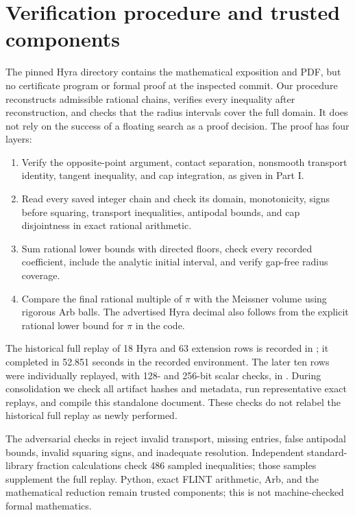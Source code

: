 \documentclass[11pt]{article}
\theoremstyle{remark}\newtheorem{remark}[theorem]{Remark}
\begin{document}
\section{Verification procedure and trusted components}\label{reproduction}
The pinned Hyra directory contains the mathematical exposition and PDF, but no certificate program or formal proof at the inspected commit. Our procedure reconstructs admissible rational chains, verifies every inequality after reconstruction, and checks that the radius intervals cover the full domain. It does not rely on the success of a floating search as a proof decision. The proof has four layers:
\begin{enumerate}
\item Verify the opposite-point argument, contact separation, nonsmooth transport identity, tangent inequality, and cap integration, as given in Part I.
\item Read every saved integer chain and check its domain, monotonicity, signs before squaring, transport inequalities, antipodal bounds, and cap disjointness in exact rational arithmetic.
\item Sum rational lower bounds with directed floors, check every recorded coefficient, include the analytic initial interval, and verify gap-free radius coverage.
\item Compare the final rational multiple of $\pi$ with the Meissner volume using rigorous Arb balls. The advertised Hyra decimal also follows from the explicit rational lower bound for $\pi$ in the code.
\end{enumerate}
The historical full replay of 18 Hyra and 63 extension rows is recorded in ; it completed in 52.851 seconds in the recorded environment. The later ten rows were individually replayed, with 128- and 256-bit scalar checks, in . During consolidation we check all artifact hashes and metadata, run representative exact replays, and compile this standalone document. These checks do not relabel the historical full replay as newly performed.

The adversarial checks in  reject invalid transport, missing entries, false antipodal bounds, invalid squaring signs, and inadequate resolution. Independent standard-library fraction calculations check 486 sampled inequalities; those samples supplement the full replay. Python, exact FLINT arithmetic, Arb, and the mathematical reduction remain trusted components; this is not machine-checked formal mathematics.
\end{document}
